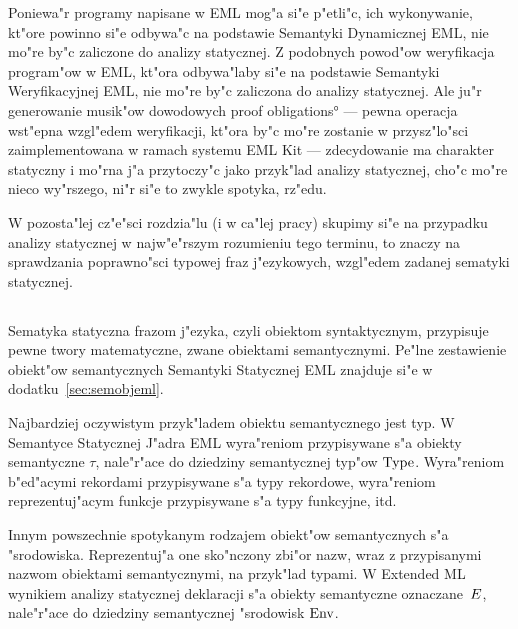 Poniewa"r programy napisane w EML mog"a si"e p"etli"c,
ich wykonywanie, kt"ore powinno si"e odbywa"c na podstawie
Semantyki Dynamicznej EML, nie mo"re by"c zaliczone do analizy statycznej.
Z podobnych powod"ow weryfikacja program"ow w EML,
kt"ora odbywa"laby si"e na podstawie Semantyki Weryfikacyjnej EML,
nie mo"re by"c zaliczona do analizy statycznej.
Ale ju"r generowanie musik"ow dowodowych \ang{proof obligations} ---
pewna operacja wst"epna wzgl"edem weryfikacji, 
kt"ora by"c mo"re zostanie w przysz"lo"sci
zaimplementowana w ramach systemu EML Kit --- 
zdecydowanie ma charakter statyczny i mo"rna j"a przytoczy"c jako przyk"lad
analizy statycznej, cho"c mo"re nieco wy"rszego, ni"r si"e to zwykle spotyka, rz"edu.

W pozosta"lej cz"e"sci rozdzia"lu (i w ca"lej pracy) 
skupimy si"e na przypadku analizy statycznej w najw"e"rszym
rozumieniu tego terminu, to znaczy na sprawdzania poprawno"sci typowej 
fraz j"ezykowych, wzgl"edem zadanej sematyki statycznej.

\subsection{\secbasic}
\label{sec:basic}

\subsubsection{\secsemantic}
\label{sec:semantic}

Sematyka statyczna frazom j"ezyka, czyli obiektom syntaktycznym, 
przypisuje pewne twory matematyczne, zwane obiektami semantycznymi.
Pe"lne zestawienie obiekt"ow semantycznych Semantyki Statycznej EML
znajduje si"e w dodatku~\ref{sec:semobjeml}.

Najbardziej oczywistym przyk"ladem obiektu semantycznego jest typ.
W Semantyce Statycznej J"adra EML wyra"reniom przypisywane s"a
obiekty semantyczne $\tau$, nale"r"ace do dziedziny semantycznej typ"ow ${\rm Type}$.
Wyra"reniom b"e\-d"a\-cy\-mi rekordami przypisywane s"a typy rekordowe,
wyra"reniom reprezentuj"acym funkcje przypisywane s"a typy funkcyjne, itd. 

Innym powszechnie spotykanym rodzajem obiekt"ow semantycznych s"a "srodowiska.
Reprezentuj"a one sko"nczony zbi"or nazw, wraz z przypisanymi nazwom
obiektami semantycznymi, na przyk"lad typami.
W Extended ML wynikiem analizy statycznej deklaracji s"a 
obiekty semantyczne oznaczane~$E$, 
nale"r"ace do dziedziny semantycznej "srodowisk ${\rm Env}$.

